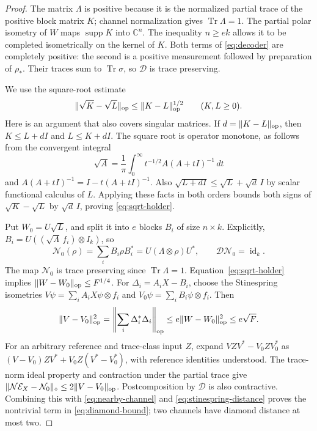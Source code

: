 \documentclass[11pt]{article}
\newcommand{\C}{\mathbb C}
\DeclareMathOperator{\Tr}{Tr}
\theoremstyle{remark}
\numberwithin{equation}{section}
\begin{document}
\begin{proof}
The matrix $\Lambda$ is positive because it is the normalized partial
trace of the positive block matrix $K$; channel normalization gives
$\Tr\Lambda=1$. The partial polar isometry of $W$ maps
$\operatorname{supp}K$ into $\C^n$. The inequality $n\ge ek$
allows it to be completed isometrically on the kernel of $K$.
Both terms of \eqref{eq:decoder} are completely positive: the second
is a positive measurement followed by preparation of $\rho_*$. Their
traces sum to $\Tr\sigma$, so $\mathcal D$ is trace preserving.

We use the square-root estimate
\begin{equation}\label{eq:sqrt-holder}
 \|\sqrt K-\sqrt L\|_{\rm op}
 \le\|K-L\|_{\rm op}^{1/2}
 \qquad(K,L\ge0).
\end{equation}
Here is an argument that also covers singular matrices. If
$d=\|K-L\|_{\rm op}$, then $K\le L+dI$ and $L\le K+dI$.
The square root is operator monotone, as follows from the convergent
integral
\[
 \sqrt A=\frac1\pi\int_0^\infty
 t^{-1/2}A(A+tI)^{-1}\,dt
\]
and $A(A+tI)^{-1}=I-t(A+tI)^{-1}$. Also
$\sqrt{L+dI}\le\sqrt L+\sqrt d\,I$ by scalar functional calculus
of $L$. Applying these facts in both orders bounds both signs of
$\sqrt K-\sqrt L$ by $\sqrt d\,I$, proving \eqref{eq:sqrt-holder}.

Put $W_0=U\sqrt L$, and split it into $e$ blocks $B_i$ of size
$n\times k$. Explicitly,
$B_i=U((\sqrt\Lambda\,f_i)\otimes I_k)$, so
\begin{equation}\label{eq:nearby-channel}
 \mathcal N_0(\rho)=\sum_iB_i\rho B_i^*
 =U(\Lambda\otimes\rho)U^*,\qquad
 \mathcal D\mathcal N_0=\operatorname{id}_k.
\end{equation}
The map $\mathcal N_0$ is trace preserving since $\Tr\Lambda=1$.
Equation~\eqref{eq:sqrt-holder} implies
$\|W-W_0\|_{\rm op}\le F^{1/4}$.
For $\Delta_i=A_iX-B_i$, choose the Stinespring isometries
$V\psi=\sum_i A_iX\psi\otimes f_i$ and
$V_0\psi=\sum_iB_i\psi\otimes f_i$. Then
\begin{equation}\label{eq:stinespring-distance}
 \|V-V_0\|_{\rm op}^2
 =\left\|\sum_i\Delta_i^*\Delta_i\right\|_{\rm op}
 \le e\|W-W_0\|_{\rm op}^2\le e\sqrt F.
\end{equation}
For an arbitrary reference and trace-class input $Z$, expand
$VZV^*-V_0ZV_0^*$ as
$(V-V_0)ZV^*+V_0Z(V^*-V_0^*)$, with reference identities understood.
The trace-norm ideal property and contraction under the partial trace
give
$\|\mathcal N\mathcal E_X-\mathcal N_0\|_\diamond
 \le2\|V-V_0\|_{\rm op}$.
Postcomposition by $\mathcal D$ is also contractive. Combining this
with \eqref{eq:nearby-channel} and \eqref{eq:stinespring-distance}
proves the nontrivial term in \eqref{eq:diamond-bound}; two channels
have diamond distance at most two.
\end{proof}
\end{document}
